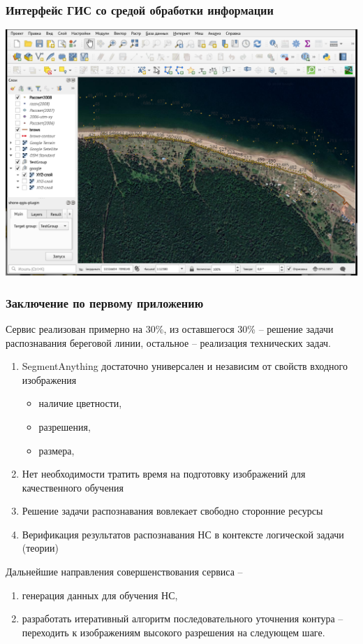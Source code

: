 \documentclass[handout]{beamer}
\begin{document}
\begin{frame}
  \frametitle{Интерфейс ГИС со средой обработки информации}
  \includegraphics[width=1\linewidth]{screen-qgis.png}
\end{frame}

\begin{frame}
  \frametitle{Заключение по первому приложению}
  Сервис реализован примерно на 30\%, из оставшегося 30\% -- решение задачи распознавания береговой линии, остальное -- реализация технических задач.
  \begin{enumerate}
  \item SegmentAnything достаточно универсален и независим от свойств входного изображения
    \begin{itemize}
    \item наличие цветности,
    \item разрешения,
    \item размера,
    \end{itemize}
  \item Нет необходимости тратить время на подготовку изображений для качественного обучения
  \item Решение задачи распознавания вовлекает свободно сторонние ресурсы
  \item Верификация результатов распознавания НС в контексте логической задачи (теории)
  \end{enumerate}
  Дальнейшие направления совершенствования сервиса --
  \begin{enumerate}
  \item генерация данных для обучения НС,
  \item разработать итеративный алгоритм последовательного уточнения контура -- переходить к изображениям высокого разрешения на следующем шаге.
  \end{enumerate}
\end{frame}
\end{document}
